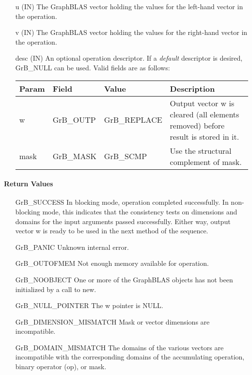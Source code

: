 \begin{itemize}[leftmargin=1.1in]
    \item[{\sf u}]     ({\sf IN}) The GraphBLAS vector holding the values for
    the left-hand vector in the operation.
    
    \item[{\sf v}]     ({\sf IN}) The GraphBLAS vector holding the values for
    the right-hand vector in the operation.

    \item[{\sf desc}]  ({\sf IN}) An optional operation descriptor.  If a \emph{default}
    descriptor is desired, {\sf GrB\_NULL} can be used.  Valid fields are
    as follows: \\
    
    \begin{tabular}{lllp{2.5in}}
        Param & Field  & Value & Description \\
        \hline
        {\sf w}    & {\sf GrB\_OUTP} & {\sf GrB\_REPLACE} & Output vector {\sf w}
        is cleared (all elements removed) before result is stored in it. \\
        {\sf mask} & {\sf GrB\_MASK} & {\sf GrB\_SCMP}   & Use the structural
        complement of {\sf mask}. \\
    \end{tabular}
\end{itemize}

\paragraph{Return Values}

\begin{itemize}[leftmargin=2.1in]
    \item[{\sf GrB\_SUCCESS}]         In blocking mode, operation
	completed successfully. In non-blocking mode, this indicates
	that the consistency tests on dimensions and domains for the
	input arguments passed successfully. Either way, output vector
	{\sf w} is ready to be used in the next method of the sequence.

    \item[{\sf GrB\_PANIC}]           Unknown internal error.
    
    \item[{\sf GrB\_OUTOFMEM}]        Not enough memory available for operation.
    
    \item[{\sf GrB\_NOOBJECT}]        One or more of the GraphBLAS objects has
    not been initialized by a call to {\sf new}.
    
    \item[{\sf GrB\_NULL\_POINTER}]  The {\sf w} pointer is {\sf NULL}.

    \item[{\sf GrB\_DIMENSION\_MISMATCH}] Mask or vector dimensions are incompatible.

	\item[{\sf GrB\_DOMAIN\_MISMATCH}]    The domains of the various
	vectors are incompatible with the corresponding domains of the
	accumulating operation, binary operator ({\sf op}), or mask.
\end{itemize}

